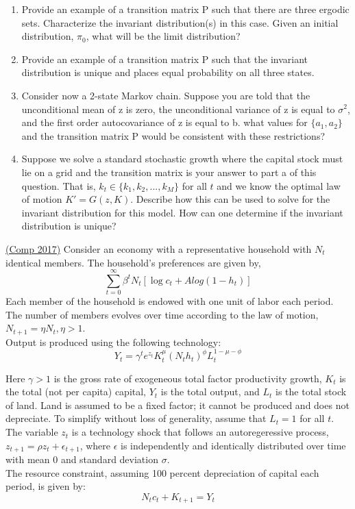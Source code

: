 \documentclass[answers]{exam}
\begin{document}
\begin{questions}
\begin{parts}
\begin{enumerate}
\begin{solution}
        \end{solution}
        \item Provide an example of a transition matrix P such that there are three ergodic sets. Characterize the invariant distribution(s) in this case. Given an initial distribution, $\pi_0$, what will be the limit distribution?
        \item Provide an example of a transition matrix P such that the invariant distribution is unique and places equal probability on all three states.
        \item Consider now a 2-state Markov chain. Suppose you are told that the unconditional mean of z is zero, the unconditional variance of z is equal to $\sigma^2$, and the first order autocovariance of z is equal to b. what values for $\{a_1,a_2\}$ and the transition matrix P would be consistent with these restrictions?
        \item Suppose we solve a standard stochastic growth where the capital stock must lie on a grid and the transition matrix is your answer to part a of this question. That is, $k_t \in \{k_1,k_2,...,k_M\}$ for all $t$ and we know the optimal law of motion $K' = G(z,K)$. Describe how this can be used to solve for the invariant distribution for this model. How can one determine if the invariant distribution is unique?
    \end{enumerate}
\end{parts}

\question \href{https://drive.google.com/drive/folders/11xTRC6EWE1VcPfk5BbXZRyGUX5oQ-jvo}{(Comp 2017)} Consider an economy with a representative household with $N_t$ identical members. The household's preferences are given by,
$$\sum_{t=0}^{\infty} \beta^t N_t [\log{c_t} + A log(1-h_t)]$$
Each member of the household is endowed with one unit of labor each period. The number of members evolves over time according to the law of motion, $N_{t+1} = \eta N_t, \eta>1$. \\
Output is produced using the following technology:
$$Y_t = \gamma^t e^{z_t} K_t^\mu (N_t h_t)^{\phi} L_t^{1-\mu - \phi}$$

Here $\gamma > 1$ is the gross rate of exogeneous total factor productivity growth, $K_t$ is the total (not per capita) capital, $Y_t$ is the total output, and $L_t$ is the total stock of land. Land is assumed to be a fixed factor; it cannot be produced and does not depreciate. To simplify without loss of generality, assume that $L_t = 1$ for all $t$. \\
The variable $z_t$ is a technology shock that follows an autoregeressive process, $z_{t+1} =\rho z_t + \epsilon_{t+1}$, where $\epsilon$ is independently and identically distributed over time with mean 0 and standard deviation $\sigma$.\\
The resource constraint, assuming 100 percent depreciation of capital each period, is given by:
$$N_t c_t + K_{t+1} = Y_t$$
\begin{parts}

\end{parts}
\end{questions}
\end{document}

